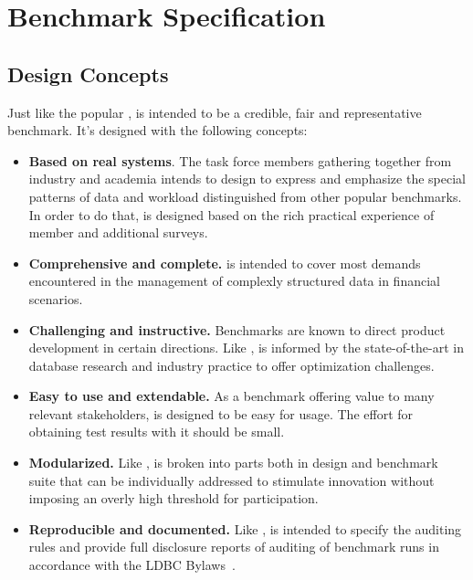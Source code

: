 \chapter{Benchmark Specification}
\label{sec:benchmark-specification}

\section{Design Concepts}

Just like the popular \ldbcsnb, \ldbcfinbench is intended to be a credible, fair
and representative benchmark. It's designed with the following concepts:

\begin{itemize}
      \item \textbf{Based on real systems}. The task force members gathering
            together from industry and academia intends to design \ldbcfinbench
            to express and emphasize the special patterns of data and workload
            distinguished from other popular benchmarks. In order to do that,
            \ldbcfinbench is designed based on the rich practical experience of
            member and additional surveys.
      \item \textbf{Comprehensive and complete.} \ldbcfinbench is intended to
            cover most demands encountered in the management of complexly
            structured data in financial scenarios.
      \item \textbf{Challenging and instructive.} Benchmarks are known to direct
            product development in certain directions. Like \ldbcsnb,
            \ldbcfinbench is informed by the state-of-the-art in database
            research and industry practice to offer optimization challenges.
      \item \textbf{Easy to use and extendable.} As a benchmark offering value
            to many relevant stakeholders, \ldbcfinbench is designed to be easy
            for usage. The effort for obtaining test results with it should be
            small.
      \item \textbf{Modularized.} Like \ldbcsnb, \ldbcfinbench is broken into
            parts both in design and benchmark suite that can be individually
            addressed to stimulate innovation without imposing an overly high
            threshold for participation.
      \item \textbf{Reproducible and documented.} Like \ldbcsnb, \ldbcfinbench
            is intended to specify the auditing rules and provide full
            disclosure reports of auditing of benchmark runs in accordance with
            the LDBC Bylaws~\cite{ldbc_byelaws}.
\end{itemize}


